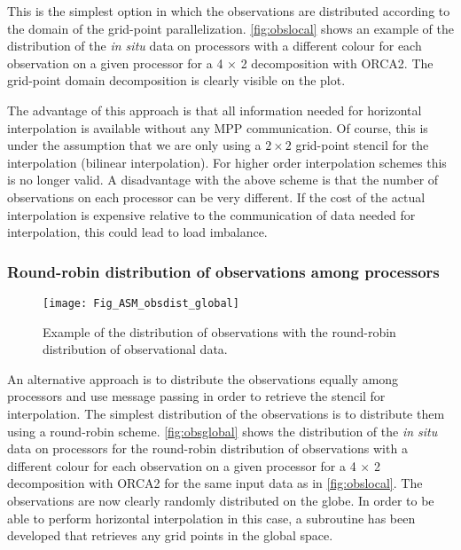 \documentclass[../main/NEMO_manual]{subfiles}
\begin{document}
This is the simplest option in which the observations are distributed according to
the domain of the grid-point parallelization.
\autoref{fig:obslocal} shows an example of the distribution of the {\em in situ} data on processors with
a different colour for each observation on a given processor for a 4 $\times$ 2 decomposition with ORCA2. 
The grid-point domain decomposition is clearly visible on the plot.

The advantage of this approach is that all information needed for horizontal interpolation is available without
any MPP communication.
Of course, this is under the assumption that we are only using a $2 \times 2$ grid-point stencil for
the interpolation (\eg bilinear interpolation).
For higher order interpolation schemes this is no longer valid.
A disadvantage with the above scheme is that the number of observations on each processor can be very different.
If the cost of the actual interpolation is expensive relative to the communication of data needed for interpolation,
this could lead to load imbalance.

\subsubsection{Round-robin distribution of observations among processors}

\begin{figure}
  \begin{center}
    \texttt{[image: Fig\_ASM\_obsdist\_global]}
    \caption{
      \protect\label{fig:obsglobal}
      Example of the distribution of observations with the round-robin distribution of observational data.
    }
  \end{center}
\end{figure}

An alternative approach is to distribute the observations equally among processors and
use message passing in order to retrieve the stencil for interpolation.
The simplest distribution of the observations is to distribute them using a round-robin scheme.
\autoref{fig:obsglobal} shows the distribution of the {\em in situ} data on processors for
the round-robin distribution of observations with a different colour for each observation on a given processor for
a 4 $\times$ 2 decomposition with ORCA2 for the same input data as in \autoref{fig:obslocal}.
The observations are now clearly randomly distributed on the globe.
In order to be able to perform horizontal interpolation in this case,
a subroutine has been developed that retrieves any grid points in the global space.
\end{document}

